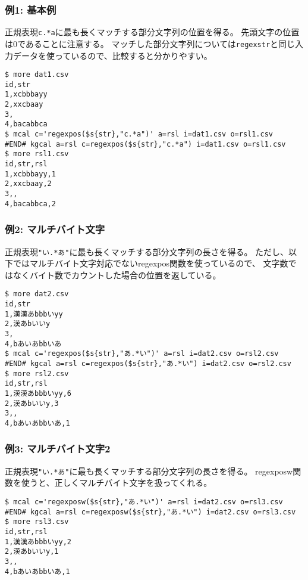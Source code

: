 \subsubsection*{例1: 基本例}

正規表現\verb|c.*a|に最も長くマッチする部分文字列の位置を得る。
先頭文字の位置は0であることに注意する。
マッチした部分文字列については\verb|regexstr|と同じ入力データを使っているので、比較すると分かりやすい。


\begin{Verbatim}[baselinestretch=0.7,frame=single]
$ more dat1.csv
id,str
1,xcbbbayy
2,xxcbaay
3,
4,bacabbca
$ mcal c='regexpos($s{str},"c.*a")' a=rsl i=dat1.csv o=rsl1.csv
#END# kgcal a=rsl c=regexpos($s{str},"c.*a") i=dat1.csv o=rsl1.csv
$ more rsl1.csv
id,str,rsl
1,xcbbbayy,1
2,xxcbaay,2
3,,
4,bacabbca,2
\end{Verbatim}
\subsubsection*{例2: マルチバイト文字}

正規表現\verb|"い.*あ"|に最も長くマッチする部分文字列の長さを得る。
ただし、以下ではマルチバイト文字対応でないregexpos関数を使っているので、
文字数ではなくバイト数でカウントした場合の位置を返している。


\begin{Verbatim}[baselinestretch=0.7,frame=single]
$ more dat2.csv
id,str
1,漢漢あbbbいyy
2,漢あbいいy
3,
4,bあいあbbいあ
$ mcal c='regexpos($s{str},"あ.*い")' a=rsl i=dat2.csv o=rsl2.csv
#END# kgcal a=rsl c=regexpos($s{str},"あ.*い") i=dat2.csv o=rsl2.csv
$ more rsl2.csv
id,str,rsl
1,漢漢あbbbいyy,6
2,漢あbいいy,3
3,,
4,bあいあbbいあ,1
\end{Verbatim}
\subsubsection*{例3: マルチバイト文字2}

正規表現\verb|"い.*あ"|に最も長くマッチする部分文字列の長さを得る。
regexposw関数を使うと、正しくマルチバイト文字を扱ってくれる。


\begin{Verbatim}[baselinestretch=0.7,frame=single]
$ mcal c='regexposw($s{str},"あ.*い")' a=rsl i=dat2.csv o=rsl3.csv
#END# kgcal a=rsl c=regexposw($s{str},"あ.*い") i=dat2.csv o=rsl3.csv
$ more rsl3.csv
id,str,rsl
1,漢漢あbbbいyy,2
2,漢あbいいy,1
3,,
4,bあいあbbいあ,1
\end{Verbatim}
